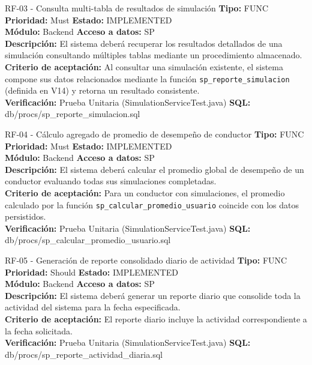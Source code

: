 \documentclass[11pt,a4paper]{article}
\begin{document}
\begin{requisito}{RF-03 - Consulta multi-tabla de resultados de simulación}
    \textbf{Tipo:} FUNC \quad \textbf{Prioridad:} Must \quad \textbf{Estado:} IMPLEMENTED \\[0.2cm]
    \textbf{Módulo:} Backend \quad \textbf{Acceso a datos:} SP \\[0.2cm]
    \textbf{Descripción:} El sistema deberá recuperar los resultados detallados de una simulación consultando múltiples tablas mediante un procedimiento almacenado. \\[0.2cm]
    \textbf{Criterio de aceptación:} Al consultar una simulación existente, el sistema compone sus datos relacionados mediante la función \texttt{sp\_reporte\_simulacion} (definida en V14) y retorna un resultado consistente. \\[0.2cm]
    \textbf{Verificación:} Prueba Unitaria (SimulationServiceTest.java) \quad \textbf{SQL:} db/procs/sp\_reporte\_simulacion.sql
\end{requisito}

\begin{requisito}{RF-04 - Cálculo agregado de promedio de desempeño de conductor}
    \textbf{Tipo:} FUNC \quad \textbf{Prioridad:} Must \quad \textbf{Estado:} IMPLEMENTED \\[0.2cm]
    \textbf{Módulo:} Backend \quad \textbf{Acceso a datos:} SP \\[0.2cm]
    \textbf{Descripción:} El sistema deberá calcular el promedio global de desempeño de un conductor evaluando todas sus simulaciones completadas. \\[0.2cm]
    \textbf{Criterio de aceptación:} Para un conductor con simulaciones, el promedio calculado por la función \texttt{sp\_calcular\_promedio\_usuario} coincide con los datos persistidos. \\[0.2cm]
    \textbf{Verificación:} Prueba Unitaria (SimulationServiceTest.java) \quad \textbf{SQL:} db/procs/sp\_calcular\_promedio\_usuario.sql
\end{requisito}

\begin{requisito}{RF-05 - Generación de reporte consolidado diario de actividad}
    \textbf{Tipo:} FUNC \quad \textbf{Prioridad:} Should \quad \textbf{Estado:} IMPLEMENTED \\[0.2cm]
    \textbf{Módulo:} Backend \quad \textbf{Acceso a datos:} SP \\[0.2cm]
    \textbf{Descripción:} El sistema deberá generar un reporte diario que consolide toda la actividad del sistema para la fecha especificada. \\[0.2cm]
    \textbf{Criterio de aceptación:} El reporte diario incluye la actividad correspondiente a la fecha solicitada. \\[0.2cm]
    \textbf{Verificación:} Prueba Unitaria (SimulationServiceTest.java) \quad \textbf{SQL:} db/procs/sp\_reporte\_actividad\_diaria.sql
\end{requisito}
\end{document}
